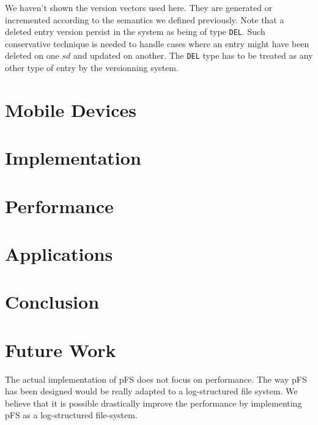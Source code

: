 \documentclass[letterpaper,twocolumn,10pt]{article}
\begin{document}
We haven't shown the version vectors used here. They are generated or
incremented according to the semantics we defined previously. Note
that a deleted entry version persist in the system as being of type
{\tt DEL}. Such conservative technique is needed to handle cases where
an entry might have been deleted on one $sd$ and updated on
another. The {\tt DEL} type has to be treated as any other type of
entry by the versionning system.



\section{Mobile Devices}

\section{Implementation}

\section{Performance}

\section{Applications}

\section{Conclusion}

\section{Future Work}

The actual implementation of pFS does not focus on performance. The
way pFS has been designed would be really adapted to a log-structured
file system. We believe that it is possible drastically improve the
performance by implementing pFS as a log-structured file-system.
\end{document}
